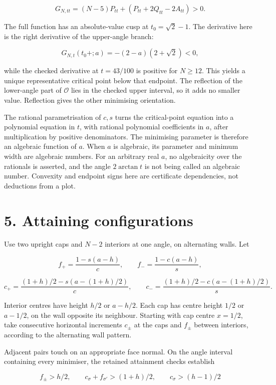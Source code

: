 \documentclass[
  11pt,
  a4paper,
]{article}
\begin{document}
\[
G_{N,tt}=(N-5)P_{tt}+(P_{tt}+2Q_{tt}-2A_{tt})>0.
\]

The full function has an absolute-value cusp at \(t_0=\sqrt2-1\). The
derivative here is the right derivative of the upper-angle branch:

\[
G_{N,t}(t_0+;a)=-(2-a)(2+\sqrt2)<0,
\]

while the checked derivative at \(t=43/100\) is positive for \(N\ge12\).
This yields a unique representative critical point below that endpoint.
The reflection of the lower-angle part of \(\mathcal O\) lies in the
checked upper interval, so it adds no smaller value. Reflection gives
the other minimising orientation.

The rational parametrisation of \(c,s\) turns the critical-point
equation into a polynomial equation in \(t\), with rational polynomial
coefficients in \(a\), after multiplication by positive denominators.
The minimising parameter is therefore an algebraic function of \(a\).
When \(a\) is algebraic, its parameter and minimum width are algebraic
numbers. For an arbitrary real \(a\), no algebraicity over the rationals
is asserted, and the angle \(2\arctan t\) is not being called an
algebraic number. Convexity and endpoint signs here are certificate
dependencies, not deductions from a plot.

\section{5. Attaining configurations}\label{attaining-configurations}

Use two upright caps and \(N-2\) interiors at one angle, on alternating
walls. Let

\[
f_+=\frac{1-s(a-h)}c,\qquad
f_-=\frac{1-c(a-h)}s,
\]

\[
c_+=\frac{(1+h)/2-s(a-(1+h)/2)}c,\qquad
c_-=\frac{(1+h)/2-c(a-(1+h)/2)}s.
\]

Interior centres have height \(h/2\) or \(a-h/2\). Each cap has centre
height \(1/2\) or \(a-1/2\), on the wall opposite its neighbour.
Starting with cap centre \(x=1/2\), take consecutive horizontal
increments \(c_\pm\) at the caps and \(f_\pm\) between interiors,
according to the alternating wall pattern.

Adjacent pairs touch on an appropriate face normal. On the angle
interval containing every minimiser, the retained attainment checks
establish

\[
f_\pm>h/2,\qquad
c_\sigma+f_{\sigma'}>(1+h)/2,\qquad
c_\sigma>(h-1)/2
\]
\end{document}
